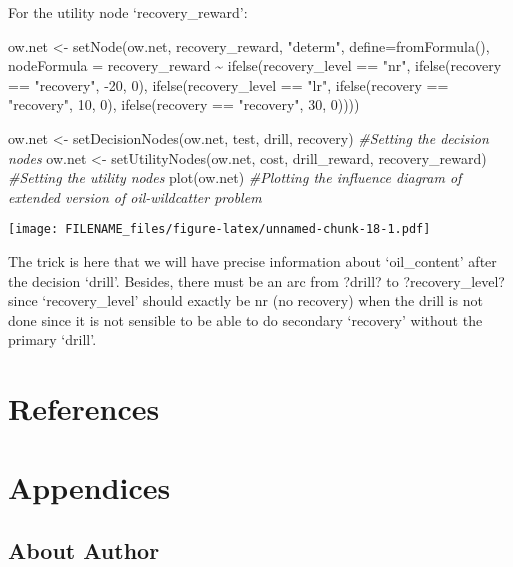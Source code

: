 \documentclass[
]{article}
\newenvironment{Shaded}{\begin{snugshade}}{\end{snugshade}}
\newcommand{\AttributeTok}[1]{\textcolor[rgb]{0.77,0.63,0.00}{#1}}
\newcommand{\CommentTok}[1]{\textcolor[rgb]{0.56,0.35,0.01}{\textit{#1}}}
\newcommand{\DecValTok}[1]{\textcolor[rgb]{0.00,0.00,0.81}{#1}}
\newcommand{\FunctionTok}[1]{\textcolor[rgb]{0.00,0.00,0.00}{#1}}
\newcommand{\NormalTok}[1]{#1}
\newcommand{\OtherTok}[1]{\textcolor[rgb]{0.56,0.35,0.01}{#1}}
\newcommand{\SpecialCharTok}[1]{\textcolor[rgb]{0.00,0.00,0.00}{#1}}
\newcommand{\StringTok}[1]{\textcolor[rgb]{0.31,0.60,0.02}{#1}}
\begin{document}
For the utility node `recovery\_reward':

\begin{Shaded}
\begin{Highlighting}[]
\NormalTok{ow.net }\OtherTok{\textless{}{-}} \FunctionTok{setNode}\NormalTok{(ow.net, recovery\_reward, }\StringTok{"determ"}\NormalTok{, }\AttributeTok{define=}\FunctionTok{fromFormula}\NormalTok{(),}
                  \AttributeTok{nodeFormula =}\NormalTok{ recovery\_reward }\SpecialCharTok{\textasciitilde{}} \FunctionTok{ifelse}\NormalTok{(recovery\_level }\SpecialCharTok{==} \StringTok{"nr"}\NormalTok{,}
                                                         \FunctionTok{ifelse}\NormalTok{(recovery }\SpecialCharTok{==} \StringTok{"recovery"}\NormalTok{, }\SpecialCharTok{{-}}\DecValTok{20}\NormalTok{, }\DecValTok{0}\NormalTok{),}
                                                         \FunctionTok{ifelse}\NormalTok{(recovery\_level }\SpecialCharTok{==} \StringTok{"lr"}\NormalTok{,}
                                                                \FunctionTok{ifelse}\NormalTok{(recovery }\SpecialCharTok{==} \StringTok{"recovery"}\NormalTok{, }\DecValTok{10}\NormalTok{, }\DecValTok{0}\NormalTok{),}
                                                                \FunctionTok{ifelse}\NormalTok{(recovery }\SpecialCharTok{==} \StringTok{"recovery"}\NormalTok{, }\DecValTok{30}\NormalTok{, }\DecValTok{0}\NormalTok{))))}

\NormalTok{ow.net }\OtherTok{\textless{}{-}} \FunctionTok{setDecisionNodes}\NormalTok{(ow.net, test, drill, recovery) }\CommentTok{\#Setting the decision nodes}
\NormalTok{ow.net }\OtherTok{\textless{}{-}} \FunctionTok{setUtilityNodes}\NormalTok{(ow.net, cost, drill\_reward, recovery\_reward) }\CommentTok{\#Setting the utility nodes}
\FunctionTok{plot}\NormalTok{(ow.net) }\CommentTok{\#Plotting the influence diagram of extended version of oil{-}wildcatter problem}
\end{Highlighting}
\end{Shaded}

\texttt{[image: FILENAME\_files/figure-latex/unnamed-chunk-18-1.pdf]}

The trick is here that we will have precise information about `oil\_content' after the decision `drill'.
Besides, there must be an arc from ?drill? to ?recovery\_level? since `recovery\_level' should exactly be nr (no recovery) when the drill is not done since it is not sensible to be able to do secondary `recovery' without the primary `drill'.

\hypertarget{references}{%
\section*{References}\label{references}}

\hypertarget{appendices}{%
\section*{Appendices}\label{appendices}}

\hypertarget{about-author}{%
\subsection*{About Author}\label{about-author}}
\end{document}
